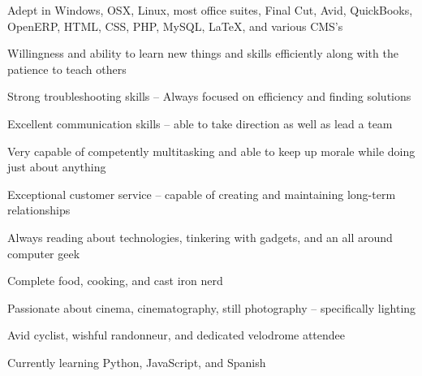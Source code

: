 \documentclass[10pt,letterpaper]{article}			%
\begin{document}
\begin{minipage}[t]{0.5\textwidth}	
	\begin{itemize*}
	\item Adept in Windows, OSX, Linux, most office suites, \mbox{Final} Cut, Avid, QuickBooks, OpenERP, HTML, CSS, PHP, MySQL, \LaTeX, and various CMS's 
	\item Willingness and ability to learn new things and skills efficiently along with the patience to teach others
	\item Strong troubleshooting skills -- Always focused on efficiency and finding solutions
	\item Excellent communication skills -- able to take direction as well as lead a team
	\item Very capable of competently multitasking and able to keep up morale while doing just about anything
	\end{itemize*}
\end{minipage}
\begin{minipage}[t]{0.5\textwidth}
	\begin{itemize*}
	\item Exceptional customer service -- capable of creating and maintaining long-term relationships
	\item Always reading about technologies, tinkering with gadgets, and an all around computer geek
	\item Complete food, cooking, and cast iron nerd
	\item Passionate about cinema, cinematography, still photography -- specifically lighting
	\item Avid cyclist, wishful randonneur, and dedicated velodrome attendee
	\item Currently learning Python, JavaScript, and Spanish
	\end{itemize*}
\end{minipage}
\end{document}
